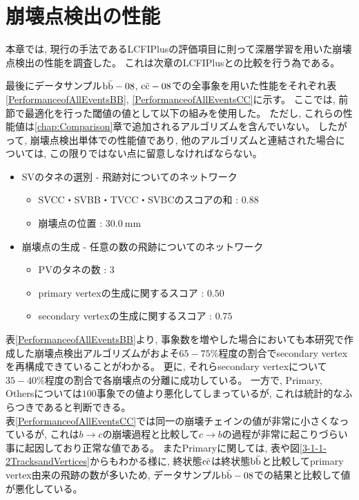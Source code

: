\section{崩壊点検出の性能} \label{VFDL:SummaryofVFDL}

本章では, 現行の手法であるLCFIPlusの評価項目に則って深層学習を用いた崩壊点検出の性能を調査した。
これは次章のLCFIPlusとの比較を行う為である。

最後にデータサンプル$\rm b\bar{b}-08$, $\rm c\bar{c}-08$での全事象を用いた性能をそれぞれ表\ref{PerformanceofAllEventsBB}, \ref{PerformanceofAllEventsCC}に示す。
ここでは, 前節で最適化を行った閾値の値として以下の組みを使用した。
ただし, これらの性能値は\ref{chap:Comparison}章で追加されるアルゴリズムを含んでいない。
したがって, 崩壊点検出単体での性能値であり, 他のアルゴリズムと連結された場合については, この限りではない点に留意しなければならない。

\begin{itemize}
 \item SVのタネの選別 - 飛跡対についてのネットワーク
 \begin{itemize}
   \item SVCC・SVBB・TVCC・SVBCのスコアの和 : $0.88$
   \item 崩壊点の位置 : $30.0\ {\mathrm{mm}}$
 \end{itemize}
 \item 崩壊点の生成 - 任意の数の飛跡についてのネットワーク
 \begin{itemize}
   \item PVのタネの数 : $3$
   \item primary vertexの生成に関するスコア : $0.50$
   \item secondary vertexの生成に関するスコア : $0.75$
 \end{itemize}
\end{itemize}

表\ref{PerformanceofAllEventsBB}より, 事象数を増やした場合においても本研究で作成した崩壊点検出アルゴリズムがおよそ$65 - 75\%$程度の割合でsecondary vertexを再構成できていることがわかる。
更に, それらsecondary vertexについて$35 - 40\%$程度の割合で各崩壊点の分離に成功している。
一方で, Primary, Othersについては$100$事象での値より悪化してしまっているが, これは統計的なふらつきであると判断できる。\\

表\ref{PerformanceofAllEventsCC}では同一の崩壊チェインの値が非常に小さくなっているが, これは$b \to c$の崩壊過程と比較して$c \to b$の過程が非常に起こりづらい事に起因しており正常な値である。
またPrimaryに関しては, 表や図\ref{3-1-1-2TracksandVertices}からもわかる様に, 終状態$\rm c\bar{c}$は終状態$\rm b\bar{b}$と比較してprimary vertex由来の飛跡の数が多いため, データサンプル$\rm b\bar{b}-08$での結果と比較して値が悪化している。

